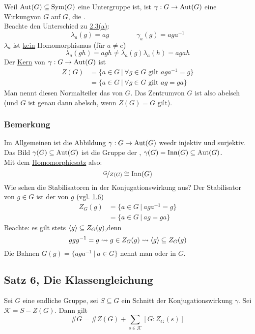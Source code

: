 Weil $\operatorname{Aut}(G)\subseteq \operatorname{Sym}(G)$ eine Untergruppe ist, ist $\gamma:G\to \operatorname{Aut}(G)$ eine Wirkungvon $G$ auf $G$, die .\\
Beachte den Unterschied zu \hyperref[sub:bsp_wirkungen]{2.3(a)}:
\[\lambda_a(g)=ag\qquad\qquad \gamma_a(g)=aga^{-1}\]
$\lambda_a$ ist \uline{kein} Homomorphismus (für $a\not=e $) \[\lambda_a(gh)=agh\not= \lambda_a(g)\lambda_a(h)=agah \]
Der \uline{Kern} von $\gamma:G\to\operatorname{Aut}(G)$ ist
\begin{equation*}
\begin{aligned}
	Z(G) &= \{a\in G~|~\forall g\in G\text{ gilt }aga^{-1}=g\}\\
	&= \{a\in G~|~\forall g\in G\text{ gilt }ag=ga \}
\end{aligned}
\end{equation*}
Man nennt diesen Normalteiler das  von $G$. Das Zentrumvon $G$ ist also abelsch (und $G$ ist genau dann abelsch, wenn $Z(G)=G$ gilt).


\subsubsection*{Bemerkung}
Im Allgemeinen ist die Abbildung $\gamma:G\to\operatorname{Aut}(G)$ weedr injektiv und surjektiv. Das Bild $\gamma(G)\subseteq\operatorname{Aut}(G)$ ist die Gruppe der , $\gamma(G)=\operatorname{Inn}(G)\subseteq \operatorname{Aut}(G)$.\\
Mit dem \hyperref[sud:der_homomorphiesatz]{Homomorphiesatz} also: \[\nicefrac{G}{Z(G)}\cong\operatorname{Inn}(G)\]
Wie sehen die Stabilisatoren in der Konjugationswirkung aus? Der Stabilisator von $g\in G$ ist der  von $g$ (vgl. \hyperref[sub:def_zentralisieren]{1.6})
\begin{equation*}
\begin{aligned}
	Z_G(g) &= \{a\in G~|~aga^{-1}=g \}\\
	&= \{a\in G~|~ag=ga \}
\end{aligned}
\end{equation*}
Beachte: es gilt stets $\langle g \rangle\subseteq Z_G(g)$,denn \[ggg^{-1}=g \rightsquigarrow g\in Z_G(g) \rightsquigarrow \langle g \rangle\subseteq Z_G(g) \]
Die Bahnen $G(g)=\{aga^{-1}~|~a\in G\}$ nennt man  oder  in $G$.


\subsection{Satz 6, Die Klassengleichung}
\label{sub:klassengleichung}
Sei $G$ eine endliche Gruppe, sei $S\subseteq G$ ein Schnitt der Konjugationswirkung $\gamma$. Sei $\mathcal{K}=S-Z(G)$. Dann gilt \[\#G=\#Z(G)+\sum_{s\in \mathcal{K}}[G:Z_G(s)] \]

